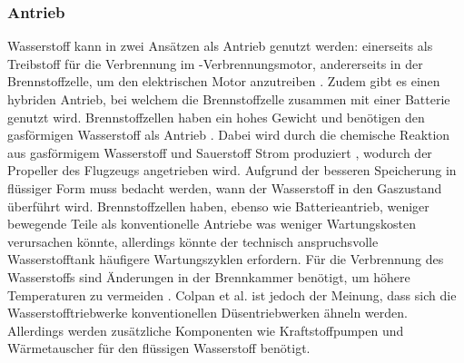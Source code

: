 \subsubsection{Antrieb}
Wasserstoff kann in zwei Ansätzen als Antrieb genutzt werden: 
einerseits als Treibstoff für die Verbrennung im -Verbrennungsmotor,
andererseits in der Brennstoffzelle, um den elektrischen Motor anzutreiben \cite{sky2020hydrogen}. 
Zudem gibt es einen hybriden Antrieb, bei welchem die Brennstoffzelle zusammen mit einer Batterie genutzt wird.
%
Brennstoffzellen haben ein hohes Gewicht \cite{hepperle2012electric} und 
benötigen den gasförmigen Wasserstoff als Antrieb \cite{colpan2022fuel}.
Dabei wird durch die chemische Reaktion aus gasförmigem Wasserstoff  und Sauerstoff  Strom produziert \cite{dalmia2022powering}, 
wodurch der Propeller des Flugzeugs angetrieben wird. Aufgrund der besseren Speicherung in flüssiger Form muss bedacht werden, wann der Wasserstoff in den Gaszustand überführt wird. 
Brennstoffzellen haben, ebenso wie Batterieantrieb, weniger bewegende Teile als konventionelle Antriebe \cite{dalmia2022powering} was weniger Wartungskosten verursachen könnte,
allerdings könnte der technisch anspruchsvolle Wasserstofftank häufigere Wartungszyklen erfordern.
%
%
%
%
Für die Verbrennung des Wasserstoffs sind Änderungen in der Brennkammer benötigt, 
um höhere Temperaturen zu vermeiden \cite{khandelwal2013hydrogen}.
Colpan et al. \cite{colpan2022fuel} ist jedoch der Meinung, 
dass sich die Wasserstofftriebwerke konventionellen Düsentriebwerken ähneln werden. 
Allerdings werden zusätzliche Komponenten wie Kraftstoffpumpen und Wärmetauscher 
für den flüssigen Wasserstoff benötigt.\\
%
